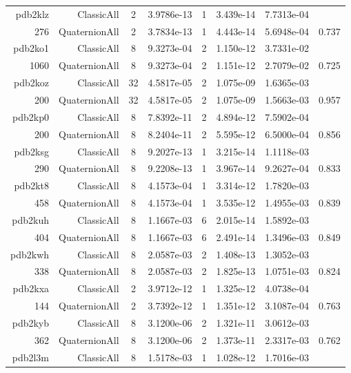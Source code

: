 \begin{xltabular}{\textwidth}{r|rcS[table-format=1.4e+2]cS[table-format=1.3e+2]S[table-format=1.4e+2]S[table-format=-1.3]}
pdb2klz & ClassicAll & 2 & 3.9786e-13 & 1 & 3.439e-14 & 7.7313e-04 & \\
276 & QuaternionAll & 2 & 3.7834e-13 & 1 & 4.443e-14 & 5.6948e-04 & 0.737\\  \addlinespace
{\color{red} pdb2ko1 } & ClassicAll & 8 & 9.3273e-04 & 2 & 1.150e-12 & 3.7331e-02 & \\
1060 & QuaternionAll & 8 & 9.3273e-04 & 2 & 1.151e-12 & 2.7079e-02 & 0.725\\  \addlinespace
pdb2koz & ClassicAll & 32 & 4.5817e-05 & 2 & 1.075e-09 & 1.6365e-03 & \\
200 & QuaternionAll & 32 & 4.5817e-05 & 2 & 1.075e-09 & 1.5663e-03 & 0.957\\  \addlinespace
pdb2kp0 & ClassicAll & 8 & 7.8392e-11 & 2 & 4.894e-12 & 7.5902e-04 & \\
200 & QuaternionAll & 8 & 8.2404e-11 & 2 & 5.595e-12 & 6.5000e-04 & 0.856\\  \addlinespace
pdb2ksg & ClassicAll & 8 & 9.2027e-13 & 1 & 3.215e-14 & 1.1118e-03 & \\
290 & QuaternionAll & 8 & 9.2208e-13 & 1 & 3.967e-14 & 9.2627e-04 & 0.833\\  \addlinespace
pdb2kt8 & ClassicAll & 8 & 4.1573e-04 & 1 & 3.314e-12 & 1.7820e-03 & \\
458 & QuaternionAll & 8 & 4.1573e-04 & 1 & 3.535e-12 & 1.4955e-03 & 0.839\\  \addlinespace
pdb2kuh & ClassicAll & 8 & 1.1667e-03 & 6 & 2.015e-14 & 1.5892e-03 & \\
404 & QuaternionAll & 8 & 1.1667e-03 & 6 & 2.491e-14 & 1.3496e-03 & 0.849\\  \addlinespace
pdb2kwh & ClassicAll & 8 & 2.0587e-03 & 2 & 1.408e-13 & 1.3052e-03 & \\
338 & QuaternionAll & 8 & 2.0587e-03 & 2 & 1.825e-13 & 1.0751e-03 & 0.824\\  \addlinespace
pdb2kxa & ClassicAll & 2 & 3.9712e-12 & 1 & 1.325e-12 & 4.0738e-04 & \\
144 & QuaternionAll & 2 & 3.7392e-12 & 1 & 1.351e-12 & 3.1087e-04 & 0.763\\  \addlinespace
pdb2kyb & ClassicAll & 8 & 3.1200e-06 & 2 & 1.321e-11 & 3.0612e-03 & \\
362 & QuaternionAll & 8 & 3.1200e-06 & 2 & 1.373e-11 & 2.3317e-03 & 0.762\\  \addlinespace
pdb2l3m & ClassicAll & 8 & 1.5178e-03 & 1 & 1.028e-12 & 1.7016e-03 & \\

\end{xltabular}
